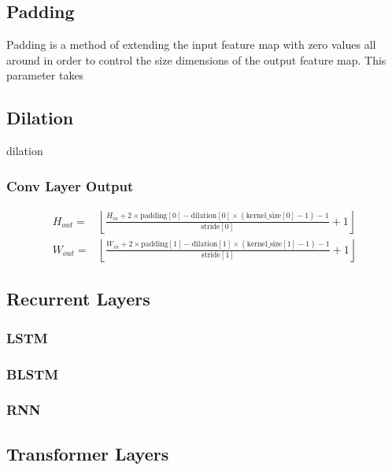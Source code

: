 \subsection*{Padding}
Padding is a method of extending the input feature map with 
zero values all around in order to control the size dimensions of the 
output feature map. This parameter takes 
\begin{figure}[H]
    \centering
{}
\end{figure}

\subsection*{Dilation}
dilation

\subsubsection{Conv Layer Output}
\begin{align}
    H_{out} =& \left\lfloor\frac{H_{in}  + 2 \times \text{padding}[0] - \text{dilation}[0]
                        \times (\text{kernel\_size}[0] - 1) - 1}{\text{stride}[0]} + 1\right\rfloor  \\
    W_{out} =& \left\lfloor\frac{W_{in}  + 2 \times \text{padding}[1] - \text{dilation}[1]
                        \times (\text{kernel\_size}[1] - 1) - 1}{\text{stride}[1]} + 1\right\rfloor
\end{align}


\subsection{Recurrent Layers}
\subsubsection{LSTM}
\subsubsection{BLSTM}
\subsubsection{RNN}

\subsection{Transformer Layers}
